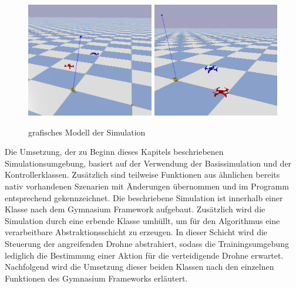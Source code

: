 \begin{figure}[htb]
    \centering
    \includegraphics[height=5cm]{lib/graphics/drone_sim.png}
    \includegraphics[height=5cm]{lib/graphics/drone_sim2.png}
    \caption[grafisches Modell der Simulation]{grafisches Modell der Simulation\footnotemark}
    \label{abb:simenv model}
\end{figure}


Die Umsetzung, der zu Beginn dieses Kapitels beschriebenen Simulationsumgebung, basiert auf der Verwendung der Basissimulation und der Kontrollerklassen. 
Zusätzlich sind teilweise Funktionen aus ähnlichen bereits nativ vorhandenen Szenarien mit Änderungen übernommen und im Programm entsprechend gekennzeichnet.
Die beschriebene Simulation ist innerhalb einer Klasse nach dem Gymnasium Framework aufgebaut.
Zusätzlich wird die Simulation durch eine erbende Klasse umhüllt, um für den Algorithmus eine verarbeitbare Abstraktionsschicht zu erzeugen.
In dieser Schicht wird die Steuerung der angreifenden Drohne abstrahiert, sodass die Trainingsumgebung lediglich die Bestimmung einer Aktion für die verteidigende Drohne erwartet.
Nachfolgend wird die Umsetzung dieser beiden Klassen nach den einzelnen Funktionen des Gymnasium Frameworks erläutert.

